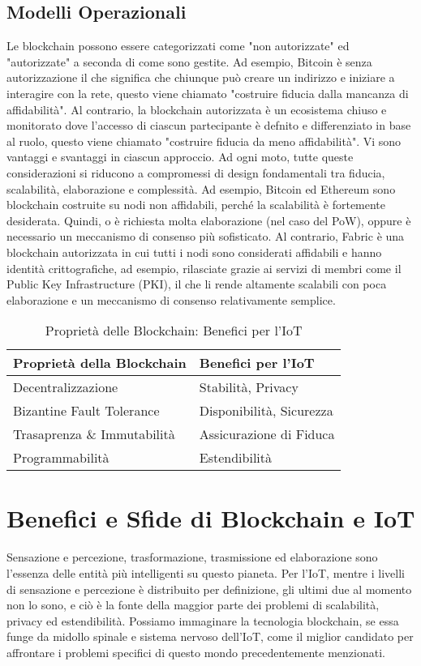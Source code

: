 \documentclass[a4paper,12pt,draft]{article}
\begin{document}
\subsection{Modelli Operazionali}
Le blockchain possono essere categorizzati come "non autorizzate" ed "autorizzate" a seconda di come sono gestite. Ad esempio, Bitcoin è senza autorizzazione il che significa che chiunque può creare un indirizzo e iniziare a interagire con la rete, questo viene chiamato "costruire fiducia dalla mancanza di affidabilità". Al contrario, la blockchain autorizzata è un ecosistema chiuso e monitorato dove l'accesso di ciascun partecipante è defnito e differenziato in base al ruolo, questo viene chiamato "costruire fiducia da meno affidabilità".
Vi sono vantaggi e svantaggi in ciascun approccio. Ad ogni moto, tutte queste considerazioni si riducono a compromessi di design fondamentali tra fiducia, scalabilità, elaborazione e complessità. Ad esempio, Bitcoin ed Ethereum sono blockchain costruite su nodi non affidabili, perché la scalabilità è fortemente desiderata. Quindi, o è richiesta molta elaborazione (nel caso del PoW), oppure è necessario un meccanismo di consenso più sofisticato. Al contrario, Fabric \cite{14} è una blockchain autorizzata in cui tutti i nodi sono considerati affidabili e hanno identità crittografiche, ad esempio, rilasciate grazie ai servizi di membri come il Public Key Infrastructure (PKI), il che li rende altamente scalabili con poca elaborazione e un meccanismo di consenso relativamente semplice.

\begin{table}[tp]%
	\caption{Proprietà delle Blockchain: Benefici per l'IoT}
	\label{table:BlockchainBenefits}\centering %
	\begin{tabular}{l|l}
		\hline
		Proprietà della Blockchain  & Benefici per l'IoT       \\
		\hline
		Decentralizzazione          & Stabilità, Privacy       \\
		Bizantine Fault Tolerance   & Disponibilità, Sicurezza \\
		Trasaprenza \& Immutabilità & Assicurazione di Fiduca  \\
		Programmabilità             & Estendibilità            \\
		\hline
	\end{tabular}
\end{table}

\section{Benefici e Sfide di Blockchain e IoT}
Sensazione e percezione, trasformazione, trasmissione ed elaborazione sono l'essenza delle entità più intelligenti su questo pianeta. Per l'IoT, mentre i livelli di sensazione e percezione è distribuito per definizione, gli ultimi due al momento non lo sono, e ciò è la fonte della maggior parte dei problemi di scalabilità, privacy ed estendibilità. Possiamo immaginare la tecnologia blockchain, se essa funge da midollo spinale e sistema nervoso dell'IoT, come il miglior candidato per affrontare i problemi specifici di questo mondo precedentemente menzionati.
\end{document}
